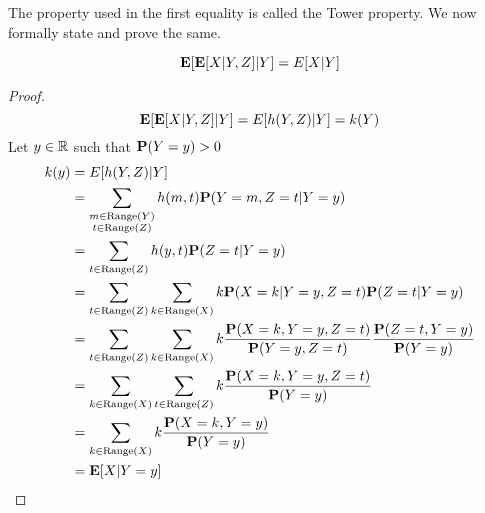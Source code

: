 \documentclass[main]{subfiles}
\begin{document}
The property used in the first equality is called the Tower property. We now formally state and prove the same.
\begin{property}
    $$\E[\E[X|Y,Z]|Y] = E[X|Y]$$
    \begin{proof}
        $$\E[\E[X|Y,Z]|Y] = E[h(Y,Z)|Y] = k(Y)$$
        Let $y \in \R$ such that $\P(Y=y) > 0$
        \begin{align*}
            k(y) & = E[h(Y,Z)|Y]                                                                                                     \\
                 & = \sum_{\substack{m \in \Range(Y)                                                                                 \\ t \in \Range(Z)}} h(m,t)\P(Y=m,Z=t|Y=y) \\
                 & = \sum_{t \in \Range(Z)} h(y,t)\P(Z=t|Y=y)                                                                        \\
                 & = \sum_{t \in \Range(Z)} \sum_{k \in \Range(X)} k \P(X=k|Y=y,Z=t)\P(Z=t|Y=y)                                      \\
                 & = \sum_{t \in \Range(Z)} \sum_{k \in \Range(X)} k \frac{\P(X=k,Y=y,Z=t)}{\P(Y=y,Z=t)} \frac{\P(Z=t,Y=y)}{\P(Y=y)} \\
                 & = \sum_{k \in \Range(X)} \sum_{t \in \Range(Z)} k \frac{\P(X=k,Y=y,Z=t)}{\P(Y=y)}                                 \\
                 & = \sum_{k \in \Range(X)} k \frac{\P(X=k,Y=y)}{\P(Y=y)}                                                            \\
                 & = \E[X|Y=y]
        \end{align*}
    \end{proof}
\end{property}
\end{document}
